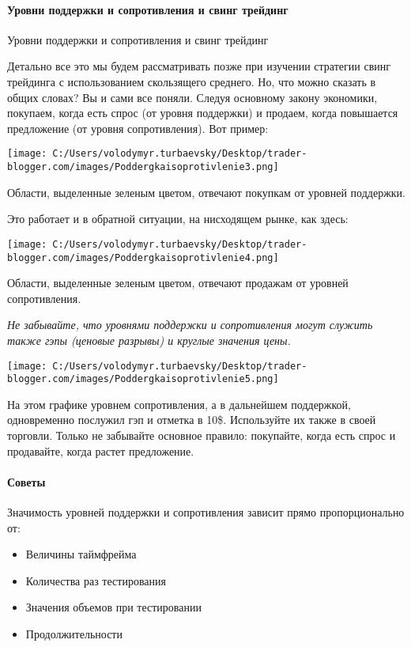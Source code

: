 \documentclass[a5paper]{article}
\begin{document}
\paragraph{Уровни поддержки и сопротивления и свинг трейдинг}

Уровни поддержки и сопротивления и свинг трейдинг

Детально все это мы будем рассматривать позже при изучении стратегии
свинг трейдинга с использованием скользящего среднего. Но, что можно
сказать в общих словах? Вы и сами все поняли. Следуя основному закону
экономики, покупаем, когда есть спрос (от уровня поддержки) и продаем,
когда повышается предложение (от уровня сопротивления). Вот пример:

\texttt{[image: C:/Users/volodymyr.turbaevsky/Desktop/trader-blogger.com/images/Poddergkaisoprotivlenie3.png]}

Области, выделенные зеленым цветом, отвечают покупкам от уровней поддержки.

Это работает и в обратной ситуации, на нисходящем рынке, как здесь:

\texttt{[image: C:/Users/volodymyr.turbaevsky/Desktop/trader-blogger.com/images/Poddergkaisoprotivlenie4.png]}

Области, выделенные зеленым цветом, отвечают продажам от уровней
сопротивления.

\emph{Не забывайте, что уровнями поддержки и сопротивления могут
  служить также гэпы (ценовые разрывы) и круглые значения цены.}

\texttt{[image: C:/Users/volodymyr.turbaevsky/Desktop/trader-blogger.com/images/Poddergkaisoprotivlenie5.png]}

На этом графике уровнем сопротивления, а в дальнейшем поддержкой,
одновременно послужил гэп и отметка в 10\$. Используйте их также в
своей торговли. Только не забывайте основное правило: покупайте, когда
есть спрос и продавайте, когда растет предложение.

\paragraph{Советы}

Значимость уровней поддержки и сопротивления зависит прямо пропорционально от:
\begin{itemize}
\item     Величины таймфрейма
\item     Количества раз тестирования
\item     Значения объемов при тестировании
\item     Продолжительности
\end{itemize}
\end{document}
